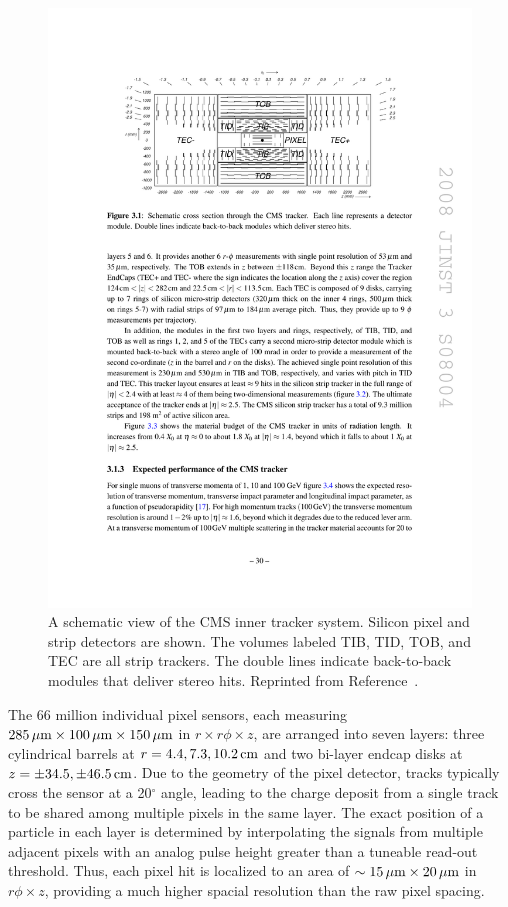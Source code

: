 \begin{figure}[htbp]
  \centering
  \includegraphics[width=\textwidth]{Detector/Figures/cms_tracker.pdf}
  \caption{
    A schematic view of the CMS inner tracker system.
    Silicon pixel and strip detectors are shown.
    The volumes labeled TIB, TID, TOB, and TEC are all strip trackers.
    The double lines indicate back-to-back modules that deliver stereo hits.
    Reprinted from Reference~\cite{CMS2008}. 
  }
  \label{fig:cms_tracker}
\end{figure}

The 66 million individual pixel sensors, each measuring $285\,\mu\text{m}\times 100\,\mu\text{m}\times 150\,\mu\text{m}$ in $r\times r\phi \times z$, are arranged into seven layers: three cylindrical barrels at $r = 4.4, 7.3, 10.2\,\text{cm}$ and two bi-layer endcap disks at $z = \pm34.5, \pm46.5 \,\text{cm}$.
Due to the geometry of the pixel detector, tracks typically cross the sensor at a 20$^\circ$ angle, leading to the charge deposit from a single track to be shared among multiple pixels in the same layer.
The exact position of a particle in each layer is determined by interpolating the signals from multiple adjacent pixels with an analog pulse height greater than a tuneable read-out threshold.
Thus, each pixel hit is localized to an area of $\sim 15 \,\mu\text{m}\times 20\,\mu\text{m}$ in $r\phi \times z$, providing a much higher spacial resolution than the raw pixel spacing.

